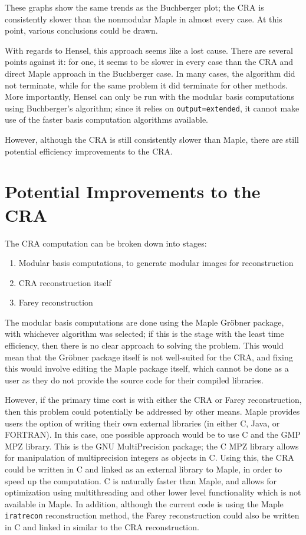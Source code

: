 \documentclass[letterpaper,12pt,titlepage,oneside,final]{book}
\begin{document}
These graphs show the same trends as the Buchberger plot; the CRA is consistently slower than the nonmodular Maple in almost every case.  At this point, various conclusions could be drawn.

With regards to Hensel, this approach seems like a lost cause.  There are several points against it: for one, it seems to be slower in every case than the CRA and direct Maple approach in the Buchberger case.  In many cases, the algorithm did not terminate, while for the same problem it did terminate for other methods.  More importantly, Hensel can only be run with the modular basis computations using Buchberger's algorithm; since it relies on \texttt{output=extended}, it cannot make use of the faster basis computation algorithms available.  %

However, although the CRA is still consistently slower than Maple, there are still potential efficiency improvements to the CRA.

\section{Potential Improvements to the CRA} 

The CRA computation can be broken down into stages:

\begin{enumerate}
  \item Modular basis computations, to generate modular images for reconstruction
  \item CRA reconstruction itself
  \item Farey reconstruction
\end{enumerate}

The modular basis computations are done using the Maple Gr\"obner package, with whichever algorithm was selected; if this is the stage with the least time efficiency, then there is no clear approach to solving the problem.  This would mean that the Gr\"obner package itself is not well-suited for the CRA, and fixing this would involve editing the Maple package itself, which cannot be done as a user as they do not provide the source code for their compiled libraries.

However, if the primary time cost is with either the CRA or Farey reconstruction, then this problem could potentially be addressed by other means.  Maple provides users the option of writing their own external libraries (in either C, Java, or FORTRAN).  In this case, one possible approach would be to use C and the GMP MPZ library.  This is the GNU MultiPrecision package; the C MPZ library allows for manipulation of multiprecision integers as objects in C.  Using this, the CRA could be written in C and linked as an external library to Maple, in order to speed up the computation.  C is naturally faster than Maple, and allows for optimization using multithreading and other lower level functionality which is not available in Maple.  In addition, although the current code is using the Maple \texttt{iratrecon} reconstruction method, the Farey reconstruction could also be written in C and linked in similar to the CRA reconstruction.
\end{document}
